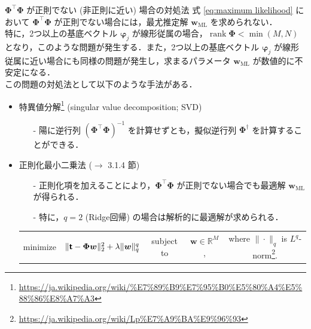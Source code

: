 \documentclass[uplatex,11pt,dvipdfmx,aspectratio=169,unicode,t]{beamer}
\numberwithin{equation}{section}
\newcommand{\BR}{\mathbb{R}}
\newcommand{\tb}[1]{\textbf{#1}}
\newcommand{\ts}[1]{\textsf{#1}}
\newcommand{\bs}[1]{\boldsymbol{#1}}
\newcommand{\1}{\bs{1}}
\newcommand{\0}{\bs{0}}
\newcommand{\norm}[1]{\|#1\|}
\DeclareMathOperator*{\rank}{rank}
\begin{document}
\begin{frame}{$\bs{\Phi}^{\top} \bs{\Phi}$ が正則でない (非正則に近い) 場合の対処法}
    式 \eqref{eq:maximum likelihood} において $\bs{\Phi}^{\top} \bs{\Phi}$ が正則でない場合には，最尤推定解 $\bs{w}_{\text{ML}}$ を求められない．\\
    特に，2つ以上の基底ベクトル $\bs{\varphi}_{j}$ が線形従属の場合，$\rank \bs{\Phi} < \min (M,N)$ となり，このような問題が発生する．また，2つ以上の基底ベクトル $\bs{\varphi}_{j}$ が線形従属に近い場合にも同様の問題が発生し，求まるパラメータ $\bs{w}_{\text{ML}}$ が数値的に不安定になる．\\
    この問題の対処法として以下のような手法がある．
    \begin{itemize}
        \item 特異値分解\footnote{\url{https://ja.wikipedia.org/wiki/\%E7\%89\%B9\%E7\%95\%B0\%E5\%80\%A4\%E5\%88\%86\%E8\%A7\%A3}} (singular value decomposition; SVD)
        \begin{itemize}
            \item[-] 陽に逆行列 $\left(\bs{\Phi}^{\top} \bs{\Phi}\right)^{-1}$ を計算せずとも，擬似逆行列 $\bs{\Phi}^{\dagger}$ を計算することができる．
        \end{itemize}
        \item 正則化最小二乗法 ($\longrightarrow$ 3.1.4 節)
        \begin{itemize}
            \item[-] 正則化項を加えることにより，$\bs{\Phi}^{\top} \bs{\Phi}$ が正則でない場合でも最適解 $\bs{w}_{\text{ML}}$ が得られる．
            \item[-] 特に，$q=2$ (Ridge回帰) の場合は解析的に最適解が求められる．
        \end{itemize}
        \vspace{-17pt}
        \begin{table}[h]
                \centering
                \begin{tabular}{ccccc}
                    minimize & $\norm{\tb{\ts{t}} - \bs{\Phi} \bs{w}}_{2}^{2} + \lambda \norm{\bs{w}}_{q}^{q}$ & subject to & $\bs{w} \in \BR^{M}$,  & where $\norm{\cdot}_{q}$ is $L^{q}$-norm\footnote{\url{https://ja.wikipedia.org/wiki/Lp\%E7\%A9\%BA\%E9\%96\%93}}.
                \end{tabular}
            \end{table}
    \end{itemize}
\end{frame}
\end{document}
